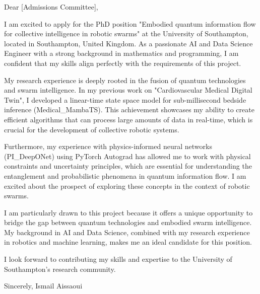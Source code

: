 \documentclass{letter}
\begin{document}
\opening{}

Dear [Admissions Committee],

I am excited to apply for the PhD position "Embodied quantum information flow for collective intelligence in robotic swarms" at the University of Southampton, located in Southampton, United Kingdom. As a passionate AI and Data Science Engineer with a strong background in mathematics and programming, I am confident that my skills align perfectly with the requirements of this project.

My research experience is deeply rooted in the fusion of quantum technologies and swarm intelligence. In my previous work on "Cardiovascular Medical Digital Twin", I developed a linear-time state space model for sub-millisecond bedside inference (Medical_MambaTS). This achievement showcases my ability to create efficient algorithms that can process large amounts of data in real-time, which is crucial for the development of collective robotic systems.

Furthermore, my experience with physics-informed neural networks (PI_DeepONet) using PyTorch Autograd has allowed me to work with physical constraints and uncertainty principles, which are essential for understanding the entanglement and probabilistic phenomena in quantum information flow. I am excited about the prospect of exploring these concepts in the context of robotic swarms.

I am particularly drawn to this project because it offers a unique opportunity to bridge the gap between quantum technologies and embodied swarm intelligence. My background in AI and Data Science, combined with my research experience in robotics and machine learning, makes me an ideal candidate for this position.

I look forward to contributing my skills and expertise to the University of Southampton's research community.

Sincerely,
Ismail Aissaoui

\closing{}
\end{document}
